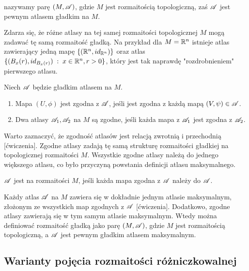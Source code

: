 \begin{definition}
   nazywamy parę $(M, \mathcal{A})$, gdzie $M$ jest rozmaitością topologiczną, zaś $\mathcal{A}$ jest pewnym atlasem gładkim na $M$.
\end{definition}

Zdarza się, że różne atlasy na tej samej rozmaitości topologicznej $M$ mogą zadawać tę samą rozmaitość gładką. Na przykład dla $M=\mathbb{R}^n$ istnieje atlas zawierający jedną mapę $\{(\mathbb{R}^n, id_{\mathbb{R}^n})\}$ oraz atlas $\{(B_x(r), id_{B_x(r)})\;:\;x\in\mathbb{R}^n, r>0\}$, który jest tak naprawdę "rozdrobnieniem" pierwszego atlasu. 

\begin{definition}
  Niech $\mathcal{A}$ będzie gładkim atlasem na $M$.

  \begin{enumerate}
    \item Mapa $(U, \phi)$ jest zgodna z $\mathcal{A}$, jeśli jest zgodna z każdą mapą $(V, \psi)\in \mathcal{A}$.
    \item Dwa atlasy $\mathcal{A}_1, \mathcal{A}_2$ na $M$ są zgodne, jeśli każda mapa z $\mathcal{A}_1$ jest zgodna z $\mathcal{A}_2$.
  \end{enumerate}
\end{definition}

Warto zaznaczyć, że zgodność atlasów jest relacją zwrotnią i przechodnią [ćwiczenia]. Zgodne atlasy zadają tę samą strukturę rozmaitości gładkiej na topologicznej rozmaitości $M$. Wszystkie zgodne atlasy należą do jednego większego atlasu, co było przyczyną powstania definicji atlasu maksymalnego.

\begin{definition}
  $\mathcal{A}$ jest  na rozmaitości $M$, jeśli każda mapa zgodna z $\mathcal{A}$ należy do $\mathcal{A}$.
\end{definition}

Każdy atlas $\mathcal{A}$ na $M$ zawiera się w dokładnie jednym atlasie maksymalnym, złożonym ze wszystkich map zgodnych z $\mathcal{A}$ [ćwiczenia]. Dodatkowo, zgodne atlasy zawierają się w tym samym atlasie maksymalnym. Wtedy można definiować rozmaitość gładką jako parę $(M, \mathcal{A})$, gdzie $M$ jest rozmaitością topologiczną, a $\mathcal{A}$ jest pewnym gładkim atlasem maksymalnym.
\bigskip

\subsection{Warianty pojęcia rozmaitości różniczkowalnej}


